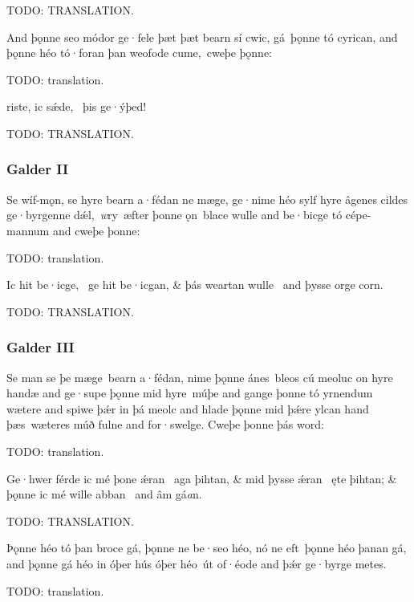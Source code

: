 \bvb TODO: TRANSLATION.\evb\evg

\bpg\bpa And þǫnne seo módor ge·fele þæt þæt bearn sí cwic, gá þǫnne tó cyrican, and þǫnne héo tó·foran þan weofode cume, cweþe þǫnne:\epa

\bpb TODO: translation.\epb\epg

\bvg\bva {}riste, ic sǽde, \hld\ þis ge·ýþed!\eva

\bvb TODO: TRANSLATION.\evb\evg


\subsubsection{Galder II}%
\chapterStart{}

\bpg\bpa Se wíf-mǫn, se hyre bearn a·fédan ne mæge, ge·nime héo sylf hyre âgenes cildes ge·byrgenne dǽl, \emph{w}ry æfter þonne ǫn blace wulle and be·bicge tó cépe-mannum and cweþe þonne:\epa

\bpb TODO: translation.\epb\epg

\bvg\bva Ic hit be·icge, \hld\ ge hit be·icgan, &
þás weartan wulle \hld\ and þysse orge corn.\eva

\bvb TODO: TRANSLATION.\evb\evg



\subsubsection{Galder III}%
\chapterStart{}

\bpg\bpa Se man se þe mæge bearn a·fédan, nime þǫnne ánes bleos cú meoluc on hyre handæ and ge·supe þǫnne mid hyre múþe and gange þonne tó yrnendum wætere and spiwe þǽr in þá meolc and hlade þǫnne mid þǽre ylcan hand þæs wæteres múð fulne and for·swelge.  Cweþe þonne þás word:\epa

\bpb TODO: translation.\epb\epg


\bvg\bva Ge·hwer férde ic mé þone ǽran \hld\ aga þihtan, &
mid þysse ǽran \hld\ ęte þihtan; &
þǫnne ic mé wille abban \hld\ and âm gá\emph{a}n.\eva

\bvb TODO: TRANSLATION.\evb\evg


\bpg\bpa Þǫnne héo tó þan broce gá, þǫnne ne be·seo héo, nó ne eft þǫnne héo þanan gá, and þǫnne gá héo in óþer hús óþer héo út of·éode and þǽr ge·byrge metes.\epa

\bpb TODO: translation.\epb\epg


\sectionline
